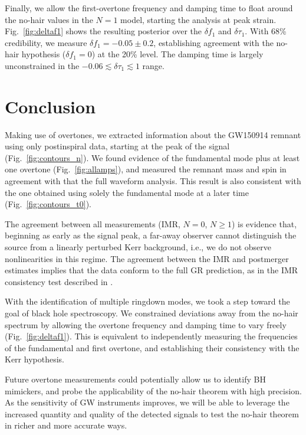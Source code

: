 \documentclass[letterpaper]{article}
\newcommand*{\fig}[1]{Fig.~\ref{fig:#1}}
\begin{document}
Finally, we allow the first-overtone frequency and damping time to float around the no-hair values in the $N=1$ model, starting the analysis at peak strain.
\fig{deltaf1} shows the resulting posterior over the $\delta f_1$ and $\delta\tau_1$.
With 68\% credibility, we measure $\delta f_1 = -0.05 \pm 0.2$, establishing agreement with the no-hair hypothesis ($\delta f_1 = 0$) at the 20\% level.
The damping time is largely unconstrained in the $-0.06 \lesssim \delta\tau_1 \lesssim 1$ range.


\section{Conclusion}
Making use of overtones, we extracted information about the GW150914 remnant using only postinspiral data, starting at the peak of the signal (\fig{contours_n}).
We found evidence of the fundamental mode plus at least one overtone (\fig{allamps}), and measured the remnant mass and spin in agreement with that the full waveform analysis.
This result is also consistent with the one obtained using solely the fundamental mode at a later time (\fig{contours_t0}).

The agreement between all measurements (IMR, $N=0$, $N\geq 1$) is evidence that, beginning as early as the signal peak, a far-away observer cannot distinguish the source from a linearly perturbed Kerr background, i.e., we do not observe nonlinearities in this regime.
The agreement between the IMR and postmerger estimates implies that the data conform to the full GR prediction, as in the IMR consistency test described in \cite{Ghosh:2016qgn,Ghosh:2017gfp}.

With the identification of multiple ringdown modes, we took a step toward the goal of black hole spectroscopy.
We constrained deviations away from the no-hair spectrum by allowing the overtone frequency and damping time to vary freely (\fig{deltaf1}).
This is equivalent to independently measuring the frequencies of the fundamental and first overtone, and establishing their consistency with the Kerr hypothesis.

Future overtone measurements could potentially allow us to identify BH mimickers, and probe the applicability of the no-hair theorem with high precision.
As the sensitivity of GW instruments improves, we will be able to leverage the increased quantity and quality of the detected signals to test the no-hair theorem in richer and more accurate ways.
\end{document}
